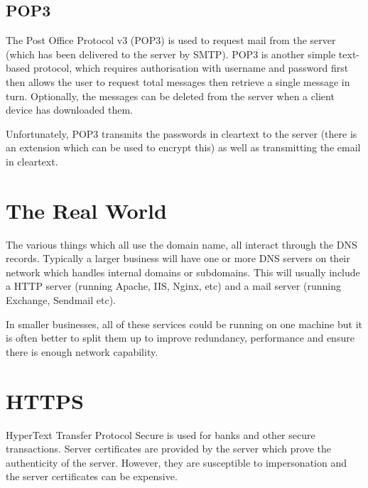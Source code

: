 \subsection{POP3}
The Post Office Protocol v3 (POP3) is used to request mail from the server (which has been delivered to the server by SMTP). POP3 is another simple text-based protocol, which requires authorisation with username and password first then allows the user to request total messages then retrieve a single message in turn. Optionally, the messages can be deleted from the server when a client device has downloaded them. 

Unfortunately, POP3 transmits the passwords in cleartext to the server (there is an extension which can be used to encrypt this) as well as transmitting the email in cleartext. 

\section{The Real World}
The various things which all use the domain name, all interact through the DNS records. Typically a larger business will have one or more DNS servers on their network which handles internal domains or subdomains. This will usually include a HTTP server (running Apache, IIS, Nginx, etc) and a mail server (running Exchange, Sendmail etc).

In smaller businesses, all of these services could be running on one machine but it is often better to split them up to improve redundancy, performance and ensure there is enough network capability. 

\section{HTTPS}
HyperText Transfer Protocol Secure is used for banks and other secure transactions. Server certificates are provided by the server which prove the authenticity of the server. However, they are susceptible to impersonation and the server certificates can be expensive. 